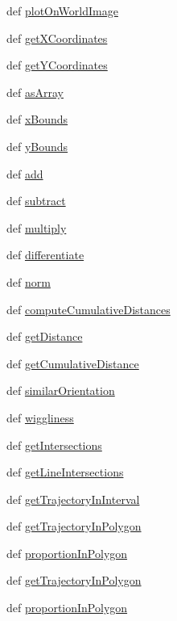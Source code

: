 \begin{DoxyCompactItemize}
\item 
def \hyperlink{classmoving_1_1Trajectory_a7b7f09cd6a32c47c0be61bf4adfcd0b3}{plot\-On\-World\-Image}
\item 
def \hyperlink{classmoving_1_1Trajectory_aa67fe10ec228b7e65f394a8b9ca89403}{get\-X\-Coordinates}
\item 
def \hyperlink{classmoving_1_1Trajectory_a8dd1611c15c8510bd5bd756baab1122c}{get\-Y\-Coordinates}
\item 
def \hyperlink{classmoving_1_1Trajectory_aae65484bb663b22e127c3133af4871e1}{as\-Array}
\item 
def \hyperlink{classmoving_1_1Trajectory_a55b3db9a3c9c1ec41a801aaae4de1037}{x\-Bounds}
\item 
def \hyperlink{classmoving_1_1Trajectory_a8d497d19280603c608940d272b01f9b6}{y\-Bounds}
\item 
def \hyperlink{classmoving_1_1Trajectory_a2da7c32adc7e330e338457ec9659cfc4}{add}
\item 
def \hyperlink{classmoving_1_1Trajectory_a33aabc7ab2452657abefdb5147e7da51}{subtract}
\item 
def \hyperlink{classmoving_1_1Trajectory_a5956cbda95979d7aba035305655b70a1}{multiply}
\item 
def \hyperlink{classmoving_1_1Trajectory_a4e81e3e869ed56eb47f09e8e3d86d4e4}{differentiate}
\item 
def \hyperlink{classmoving_1_1Trajectory_aa991a0f51f639c74735f6e2796e2ed74}{norm}
\item 
def \hyperlink{classmoving_1_1Trajectory_ae168fe24c779132f9f3a6a1473923e9f}{compute\-Cumulative\-Distances}
\item 
def \hyperlink{classmoving_1_1Trajectory_a6908201d436ffc6b8dc6606bdc6451a3}{get\-Distance}
\item 
def \hyperlink{classmoving_1_1Trajectory_ab40518929218d6fbddb966e57f6c06a0}{get\-Cumulative\-Distance}
\item 
def \hyperlink{classmoving_1_1Trajectory_aac33975f6862a60e681d956a2d0e4c1f}{similar\-Orientation}
\item 
def \hyperlink{classmoving_1_1Trajectory_a2dac1e3a6555f2f5a6851debae5b459e}{wiggliness}
\item 
def \hyperlink{classmoving_1_1Trajectory_af754ff6e543a76bd8e5d0cabf692d226}{get\-Intersections}
\item 
def \hyperlink{classmoving_1_1Trajectory_aed69b3aaa87ce67288afeb03a20b796b}{get\-Line\-Intersections}
\item 
def \hyperlink{classmoving_1_1Trajectory_acd84fbbe80b81e1a5f0619c94eae0b07}{get\-Trajectory\-In\-Interval}
\item 
def \hyperlink{classmoving_1_1Trajectory_aa89c46d86cc00a93222ded9b71ca5da6}{get\-Trajectory\-In\-Polygon}
\item 
def \hyperlink{classmoving_1_1Trajectory_acfafe39991910a5a6782024cf44a51b8}{proportion\-In\-Polygon}
\item 
def \hyperlink{classmoving_1_1Trajectory_aa89c46d86cc00a93222ded9b71ca5da6}{get\-Trajectory\-In\-Polygon}
\item 
def \hyperlink{classmoving_1_1Trajectory_acfafe39991910a5a6782024cf44a51b8}{proportion\-In\-Polygon}
\end{DoxyCompactItemize}
